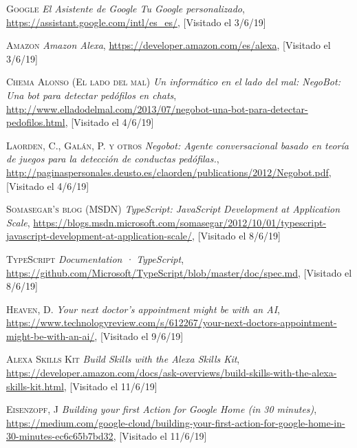 \documentclass[spanish,12pt, a4paper, twoside]{paper}
\begin{document}
\begin{thebibliography}{00}
 \textsc{Google} \textit{El Asistente de Google \textbar Tu Google personalizado}, \url{https://assistant.google.com/intl/es_es/}, [Visitado el 3/6/19]

 \textsc{Amazon} \textit{Amazon Alexa}, \url{https://developer.amazon.com/es/alexa}, [Visitado el 3/6/19]

 \textsc{Chema Alonso (El lado del mal)} \textit{Un informático en el lado del mal: NegoBot: Una bot para detectar pedófilos en chats}, \url{http://www.elladodelmal.com/2013/07/negobot-una-bot-para-detectar-pedofilos.html}, [Visitado el 4/6/19]

 \textsc{Laorden, C., Galán, P. y otros} \textit{Negobot: Agente conversacional basado en teoría de juegos para la detección de conductas pedófilas.}, \url{http://paginaspersonales.deusto.es/claorden/publications/2012/Negobot.pdf}, [Visitado el 4/6/19]

 \textsc{Somasegar's blog (MSDN)} \textit{TypeScript: JavaScript Development at Application Scale}, \url{https://blogs.msdn.microsoft.com/somasegar/2012/10/01/typescript-javascript-development-at-application-scale/}, [Visitado el 8/6/19]

 \textsc{TypeScript} \textit{Documentation · TypeScript}, \url{https://github.com/Microsoft/TypeScript/blob/master/doc/spec.md}, [Visitado el 8/6/19]

 \textsc{Heaven, D.} \textit{Your next doctor’s appointment might be with an AI}, \url{https://www.technologyreview.com/s/612267/your-next-doctors-appointment-might-be-with-an-ai/}, [Visitado el 9/6/19]

 \textsc{Alexa Skills Kit} \textit{Build Skills with the Alexa Skills Kit}, \url{https://developer.amazon.com/docs/ask-overviews/build-skills-with-the-alexa-skills-kit.html}, [Visitado el 11/6/19]

 \textsc{Eisenzopf, J} \textit{Building your first Action for Google Home (in 30 minutes)}, \url{https://medium.com/google-cloud/building-your-first-action-for-google-home-in-30-minutes-ec6c65b7bd32}, [Visitado el 11/6/19]
\end{thebibliography}
\end{document}
